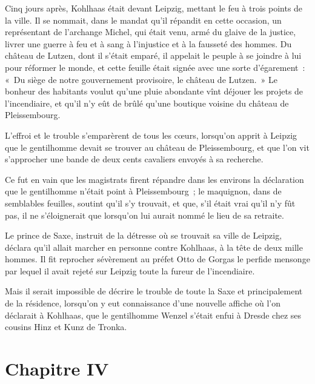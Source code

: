 \documentclass[french,twoside]{book} %
\newcommand\chapteropen{} %
\newcommand\chapterclose{} %
\begin{document}
Cinq jours après, Kohlhaas était devant Leipzig, mettant le feu à trois points de la ville. Il se nommait, dans le mandat qu’il répandit en cette occasion, un représentant de l’archange Michel, qui était venu, armé du glaive de la justice, livrer une guerre à feu et à sang à l’injustice et à la fausseté des hommes. Du château de Lutzen, dont il s’était emparé, il appelait le peuple à se joindre à lui pour réformer le monde, et cette feuille était signée avec une sorte d’égarement : « Du siège de notre gouvernement provisoire, le château de Lutzen. » Le bonheur des habitants voulut qu’une pluie abondante vînt déjouer les projets de l’incendiaire, et qu’il n’y eût de brûlé qu’une boutique voisine du château de Pleissembourg.\par
L’effroi et le trouble s’emparèrent de tous les cœurs, lorsqu’on apprit à Leipzig que le gentilhomme devait se trouver au château de Pleissembourg, et que l’on vit s’approcher une bande de deux cents cavaliers envoyés à sa recherche.\par
Ce fut en vain que les magistrats firent répandre dans les environs la déclaration que le gentilhomme n’était point à Pleissembourg ; le maquignon, dans de semblables feuilles, soutint qu’il s’y trouvait, et que, s’il était vrai qu’il n’y fût pas, il ne s’éloignerait que lorsqu’on lui aurait nommé le lieu de sa retraite.\par
Le prince de Saxe, instruit de la détresse où se trouvait sa ville de Leipzig, déclara qu’il allait marcher en personne contre Kohlhaas, à la tête de deux mille hommes. Il fit reprocher sévèrement au préfet Otto de Gorgas le perfide mensonge par lequel il avait rejeté sur Leipzig toute la fureur de l’incendiaire.\par
Mais il serait impossible de décrire le trouble de toute la Saxe et principalement de la résidence, lorsqu’on y eut connaissance d’une nouvelle affiche où l’on déclarait à Kohlhaas, que le gentilhomme Wenzel s’était enfui à Dresde chez ses cousins Hinz et Kunz de Tronka.
\chapterclose


\chapteropen
\chapter[{Chapitre IV}]{Chapitre IV}\renewcommand{\leftmark}{Chapitre IV}
\end{document}
